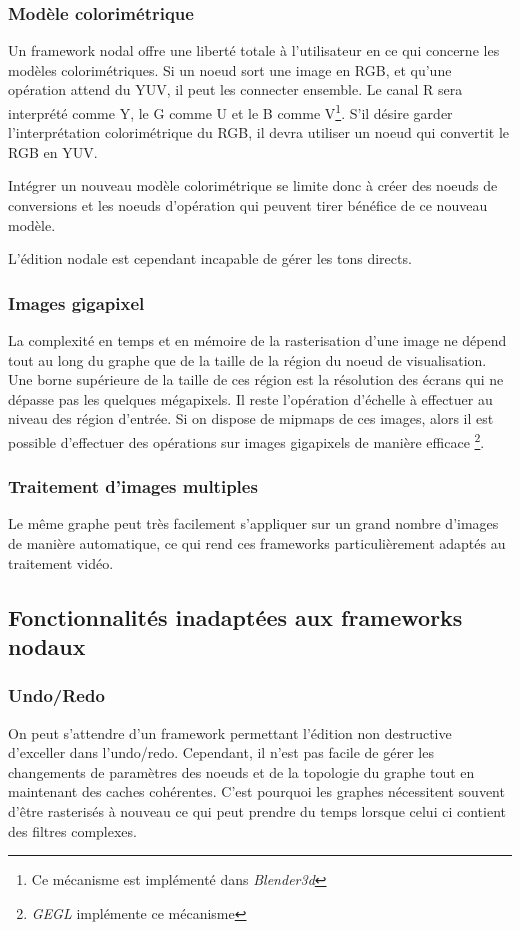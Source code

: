 			\subsubsection{Modèle colorimétrique}
				Un framework nodal offre une liberté totale à l'utilisateur en ce qui concerne les modèles colorimétriques. Si un noeud sort
				une image en RGB, et qu'une opération attend du YUV, il peut les connecter ensemble. Le canal R sera interprété comme Y, le G comme
				U et le B comme V\footnote{Ce mécanisme est implémenté dans \emph{Blender3d}}. S'il désire garder l'interprétation colorimétrique du RGB, il devra utiliser un noeud qui convertit le RGB en YUV.

				Intégrer un nouveau modèle colorimétrique se limite donc à créer des noeuds de conversions et les noeuds d'opération qui peuvent
				tirer bénéfice de ce nouveau modèle.

				L'édition nodale est cependant incapable de gérer les tons directs.
			
				
			\subsubsection{Images gigapixel}
				La complexité en temps et en mémoire de la rasterisation d'une image ne dépend tout au long du graphe que de la taille de
				la région du noeud de visualisation. Une borne supérieure de la taille de ces région est la résolution des écrans qui ne
				dépasse pas les quelques mégapixels. Il reste l'opération d'échelle à effectuer au niveau des région d'entrée. Si on
				dispose de mipmaps de ces images, alors il est possible d'effectuer des opérations sur images gigapixels de manière efficace
				\footnote{\emph{GEGL} implémente ce mécanisme}.
			\subsubsection{Traitement d'images multiples}
				Le même graphe peut très facilement s'appliquer sur un grand nombre d'images de manière automatique, ce qui rend ces frameworks
				particulièrement adaptés au traitement vidéo.
				
		\subsection{Fonctionnalités inadaptées aux frameworks nodaux}
			\subsubsection{Undo/Redo}
				On peut s'attendre d'un framework permettant l'édition non destructive d'exceller dans l'undo/redo. Cependant, il n'est pas
				facile de gérer les changements de paramètres des noeuds et de la topologie du graphe tout en maintenant des caches cohérentes.
				C'est pourquoi les graphes nécessitent souvent d'être rasterisés à nouveau ce qui peut prendre du temps lorsque celui ci contient
				des filtres complexes. 
